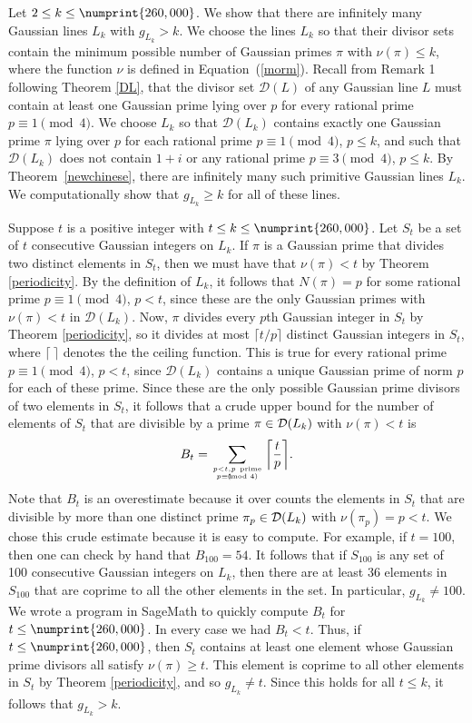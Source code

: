 \documentclass[11pt]{article}
\newcommand{\DL}{{\mathcal{D}}(L)}
\newcommand{\DLk}{{\mathcal{D}}(L_k)}
\begin{document}
\bigskip

 Let $2\leq k\leq  \numprint{260,000}$.   We show that there are infinitely many Gaussian lines  $L_k$ with $g_{L_k}>k$.  We choose the lines $L_k$ so that their divisor sets contain the minimum possible number of Gaussian primes $\pi$ with $\nu(\pi)\leq k$, where the function $\nu$ is defined in Equation~(\ref{morm}).
Recall from Remark 1 following Theorem \ref{DL}, that the divisor set $\DL$ of any Gaussian line $L$ must contain at least one Gaussian prime lying over $p$ for every rational prime $p\equiv 1\pmod 4$.  We choose $L_k$ so that $\DLk$ contains exactly one Gaussian prime $\pi$ lying over $p$ for each rational prime $p\equiv 1\pmod 4$, $p\leq k$, and 
such that $\DLk$ does not contain $1+i$ or any rational prime $p\equiv 3 \pmod 4$, $p\leq k$.  By Theorem~\ref{newchinese}, there are infinitely many such primitive Gaussian lines $L_k$.  We computationally show that $g_{L_k}\geq k$ for all of these lines. 

Suppose $t$ is a positive integer with $t\leq k\leq \numprint{260,000}$.  Let $S_t$ be a set of $t$ consecutive Gaussian integers on $L_k$. If $\pi$ is a Gaussian prime that divides two distinct elements in $S_t$,  then we must have that $\nu(\pi)< t$  by Theorem \ref{periodicity}.  By the definition of $L_k$, it follows that $N(\pi)=p$ for some rational prime $p\equiv 1\pmod 4$, $p<t$, since these are the only Gaussian primes with $\nu(\pi)< t$ in 
$\DLk$. Now, $\pi$  divides every $p$th Gaussian integer in $S_t$ by Theorem \ref{periodicity}, so it divides at most $\lceil{{t/p}}\rceil$ distinct Gaussian integers in $S_t$, where $\lceil{{\ }}\rceil$ denotes the the ceiling function. This is true for every rational prime  $p\equiv 1\pmod 4$, $p<t$, since $\DLk$ contains a unique Gaussian prime of norm $p$ for each of these prime.  Since these are the only possible Gaussian prime divisors of two elements in $S_t$, it follows that  a crude upper bound for the number of elements of $S_t$ that are divisible by a prime $\pi\in{\cal D}(L_k)$ with $\nu(\pi)< t$ is 
$$B_t=\sum_{{p<t, p\ {\rm prime}}\atop {p\equiv 1\hskip-.1in\pmod 4}}{\left\lceil{t\over p}\right\rceil}.$$
Note that $B_t$ is an overestimate because it over counts the elements in $S_t$ that are divisible by more than one distinct prime $\pi_p\in{\cal D}(L_k)$ with $\nu(\pi_p)=p< t$.
We chose this crude estimate because it is easy to  compute.
For example, if $t=100$, then one can check by hand that $B_{100}=54$.  It follows that if $S_{100}$ is any set of 100 consecutive Gaussian integers on $L_k$, then there are at least 36 elements in $S_{100}$ that are coprime to all the other elements in the set. In particular, $g_{L_k}\neq 100$.  We wrote a program in SageMath \cite{sage} to quickly compute $B_t$ for $t\leq \numprint{260,000}$.  In every case we had $B_t<t$.  
Thus, if $t\leq \numprint{260,000}$, then $S_t$ contains at least one element whose Gaussian prime divisors all satisfy $\nu(\pi)\geq t$.  This element is coprime to all other elements in $S_t$  by Theorem \ref{periodicity}, and so $g_{L_k}\neq t$.  Since this holds for all $t\leq k$,  it follows that $g_{L_k}> k$.  
\end{document}
